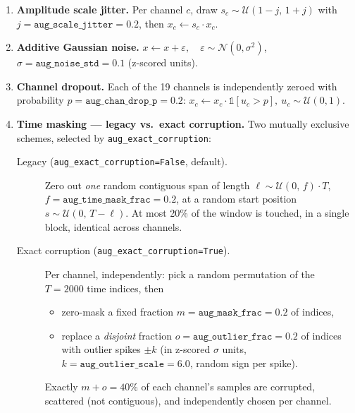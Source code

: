 \documentclass[10pt,a4paper]{article}
\begin{document}
\begin{enumerate}
  \item \textbf{Amplitude scale jitter.} Per channel $c$, draw
  $s_c \sim \mathcal{U}(1-j,\,1+j)$ with $j = \texttt{aug\_scale\_jitter} = 0.2$, then
  $x_c \leftarrow s_c \cdot x_c$.

  \item \textbf{Additive Gaussian noise.}
  $x \leftarrow x + \varepsilon,\quad \varepsilon \sim \mathcal{N}(0, \sigma^2)$,
  $\sigma = \texttt{aug\_noise\_std} = 0.1$ (z-scored units).

  \item \textbf{Channel dropout.} Each of the 19 channels is independently zeroed
  with probability $p = \texttt{aug\_chan\_drop\_p} = 0.2$:
  $x_c \leftarrow x_c \cdot \mathbb{1}[u_c > p],\ u_c \sim \mathcal{U}(0,1)$.

  \item \textbf{Time masking — legacy vs.\ exact corruption.} Two mutually
  exclusive schemes, selected by \texttt{aug\_exact\_corruption}:

  \begin{description}
    \item[Legacy (\texttt{aug\_exact\_corruption=False}, default).] Zero out
    \emph{one} random contiguous span of length
    $\ell \sim \mathcal{U}(0,\, f)\cdot T$, $f=\texttt{aug\_time\_mask\_frac}=0.2$,
    at a random start position $s \sim \mathcal{U}(0,\, T-\ell)$. At most 20\% of
    the window is touched, in a single block, identical across channels.

    \item[Exact corruption (\texttt{aug\_exact\_corruption=True}).] Per channel,
    independently: pick a random permutation of the $T=2000$ time indices, then
    \begin{itemize}
      \item zero-mask a fixed fraction $m=\texttt{aug\_mask\_frac}=0.2$ of indices,
      \item replace a \emph{disjoint} fraction $o=\texttt{aug\_outlier\_frac}=0.2$
      of indices with outlier spikes $\pm k$ (in z-scored $\sigma$ units,
      $k=\texttt{aug\_outlier\_scale}=6.0$, random sign per spike).
    \end{itemize}
    Exactly $m+o = 40\%$ of each channel's samples are corrupted, scattered
    (not contiguous), and independently chosen per channel.
  \end{description}
\end{enumerate}
\end{document}
